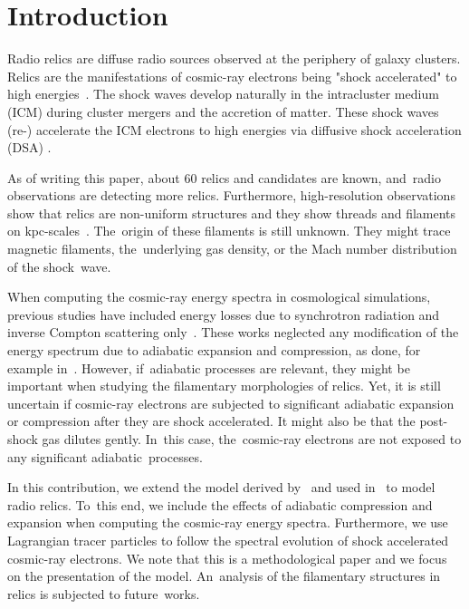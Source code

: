 \documentclass[galaxies,article,accept,moreauthors,pdftex]{mdpi}
\newcommand{\kpc}{\mathrm{kpc}}
\begin{document}
\section{Introduction}
 Radio relics are diffuse radio sources observed at the periphery of galaxy clusters. Relics are the manifestations of cosmic-ray electrons being "shock accelerated" to high energies~\cite{2014IJMPD..2330007B,vanweeren2019review,bykov2019review}. The shock waves develop naturally in the intracluster medium (ICM) during cluster mergers and the accretion of matter. These shock waves (re-) accelerate the ICM electrons to high energies via diffusive shock acceleration (DSA) \cite{1983RPPh...46..973D,ensslin1998}.
 
 As of writing this paper, about 60 relics and candidates are known, and~radio observations are detecting more relics. Furthermore, high-resolution observations show that relics are non-uniform structures and they show threads and filaments on $\kpc$-scales~\cite{rajpurohit2021macsspec,rajpurohit2021A2744}. The~origin of these filaments is still unknown. They might trace magnetic filaments, the~underlying gas density, or the Mach number distribution of the shock~wave.
  
 
 {{When computing the cosmic-ray energy spectra in cosmological simulations, previous studies have included energy losses due to synchrotron radiation and inverse Compton scattering only~\cite{2007MNRAS.375...77H,2012MNRAS.420.2006N,2017MNRAS.470..240N,wittor2019pol,wittor2021mach}.}} These works neglected any modification of the energy spectrum due to adiabatic expansion and compression, as done, for example in~\cite{paola1, paola2}. However, if~adiabatic processes are relevant, they might be important when studying the filamentary morphologies of relics. Yet, it is still uncertain if cosmic-ray electrons are subjected to significant adiabatic expansion or compression after they are shock accelerated. It might also be that the post-shock gas dilutes gently. In~this case, the~cosmic-ray electrons are not exposed to any significant adiabatic~processes.
  
 In this contribution, we extend the model derived by~\cite{2007MNRAS.375...77H} and used in~\cite{2012MNRAS.420.2006N,2017MNRAS.470..240N,wittor2019pol,wittor2021mach} to model radio relics. To~this end, we include the effects of adiabatic compression and expansion when computing the cosmic-ray energy spectra. Furthermore, we use Lagrangian tracer particles to follow the spectral evolution of shock accelerated cosmic-ray electrons. We note that this is a methodological paper and we focus on the presentation of the model. An~analysis of the filamentary structures in relics is subjected to future~works.
 
\end{document}
